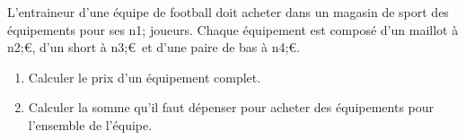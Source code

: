\documentclass[exercice]{thedocument}%
\begin{document}
%
L'entraineur d'une équipe de football doit acheter dans un magasin de sport des
équipements pour ses \<n1; joueurs. Chaque équipement est composé d'un maillot
à \<n2;\euro, d'un short à \<n3;\euro\ et d'une paire de bas à \<n4;\euro.
\begin{enumerate}
    \item Calculer le prix d'un équipement complet.
    \item Calculer la somme qu'il faut dépenser pour acheter des équipements pour
    l'ensemble de l'équipe.
\end{enumerate}
\end{document}
